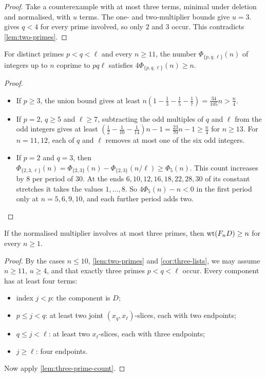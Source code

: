 \begin{proof}
Take a counterexample with at most three terms, minimal under deletion and normalised, with $u$ terms. The one- and two-multiplier bounds give $u=3$.  gives $q<4$ for every prime involved, so only $2$ and $3$ occur. This contradicts \cref{lem:two-primes}.
\end{proof}

\begin{lemma}\label{lem:three-prime-count}
For distinct primes $p<q<\ell$ and every $n\ge11$, the number $\Phi_{\{p,q,\ell\}}(n)$ of integers up to $n$ coprime to $pq\ell$ satisfies $4\Phi_{\{p,q,\ell\}}(n)\ge n$.
\end{lemma}

\begin{proof}
\begin{itemize}
\item If $p\ge3$, the union bound gives at least $n(1-\frac13-\frac15-\frac17)=\frac{34}{105}n>\frac n4$.
\item If $p=2$, $q\ge5$ and $\ell\ge7$, subtracting the odd multiples of $q$ and $\ell$ from the odd integers gives at least $(\frac12-\frac1{10}-\frac1{14})n-1=\frac{23}{70}n-1\ge\frac n4$ for $n\ge13$. For $n=11,12$, each of $q$ and $\ell$ removes at most one of the six odd integers.
\item If $p=2$ and $q=3$, then $\Phi_{\{2,3,\ell\}}(n)=\Phi_{\{2,3\}}(n)-\Phi_{\{2,3\}}(n/\ell)\ge\Phi_5(n)$. This count increases by $8$ per period of $30$. At the ends $6,10,12,16,18,22,28,30$ of its constant stretches it takes the values $1,\dots,8$. So $4\Phi_5(n)-n<0$ in the first period only at $n=5,6,9,10$, and each further period adds two.
\end{itemize}
\end{proof}

\begin{theorem}\label{thm:three-primes}
If the normalised multiplier involves at most three primes, then $\operatorname{wt}(F_nD)\ge n$ for every $n\ge1$.
\end{theorem}

\begin{proof}
By the cases $n\le10$, \cref{lem:two-primes} and \cref{cor:three-lists}, we may assume $n\ge11$, $u\ge4$, and that exactly three primes $p<q<\ell$ occur. Every component has at least four terms:
\begin{itemize}
\item index $j<p$: the component is $D$;
\item $p\le j<q$: at least two joint $(x_q,x_\ell)$-slices, each with two endpoints;
\item $q\le j<\ell$: at least two $x_\ell$-slices, each with three endpoints;
\item $j\ge\ell$: four endpoints.
\end{itemize}
Now apply \cref{lem:three-prime-count}.
\end{proof}

